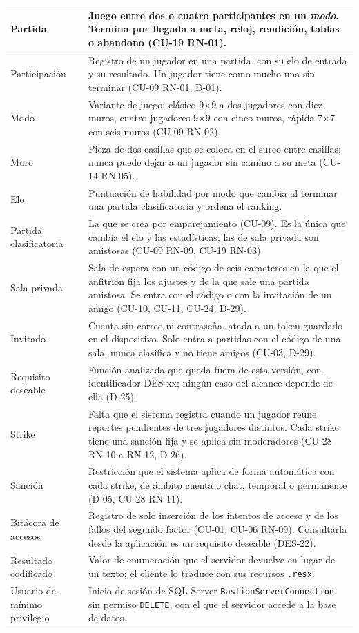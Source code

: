 \documentclass[11pt,letterpaper]{article}
\begin{document}
\begin{xltabular}{\linewidth}{|p{5.2cm}|Y|}
  Partida & Juego entre dos o cuatro participantes en un \textit{modo}. Termina por llegada a meta, reloj, rendición, tablas o abandono (CU-19 RN-01).\\\hline
  Participación & Registro de un jugador en una partida, con su elo de entrada y su resultado. Un jugador tiene como mucho una sin terminar (CU-09 RN-01, D-01).\\\hline
  Modo & Variante de juego: clásico 9×9 a dos jugadores con diez muros, cuatro jugadores 9×9 con cinco muros, rápida 7×7 con seis muros (CU-09 RN-02).\\\hline
  Muro & Pieza de dos casillas que se coloca en el surco entre casillas; nunca puede dejar a un jugador sin camino a su meta (CU-14 RN-05).\\\hline
  Elo & Puntuación de habilidad por modo que cambia al terminar una partida clasificatoria y ordena el ranking.\\\hline
  Partida clasificatoria & La que se crea por emparejamiento (CU-09). Es la única que cambia el elo y las estadísticas; las de sala privada son amistosas (CU-09 RN-09, CU-19 RN-03).\\\hline
  Sala privada & Sala de espera con un código de seis caracteres en la que el anfitrión fija los ajustes y de la que sale una partida amistosa. Se entra con el código o con la invitación de un amigo (CU-10, CU-11, CU-24, D-29).\\\hline
  Invitado & Cuenta sin correo ni contraseña, atada a un token guardado en el dispositivo. Solo entra a partidas con el código de una sala, nunca clasifica y no tiene amigos (CU-03, D-29).\\\hline
  Requisito deseable & Función analizada que queda fuera de esta versión, con identificador DES-xx; ningún caso del alcance depende de ella (D-25).\\\hline
  Strike & Falta que el sistema registra cuando un jugador reúne reportes pendientes de tres jugadores distintos. Cada strike tiene una sanción fija y se aplica sin moderadores (CU-28 RN-10 a RN-12, D-26).\\\hline
  Sanción & Restricción que el sistema aplica de forma automática con cada strike, de ámbito cuenta o chat, temporal o permanente (D-05, CU-28 RN-11).\\\hline
  Bitácora de accesos & Registro de solo inserción de los intentos de acceso y de los fallos del segundo factor (CU-01, CU-06 RN-09). Consultarla desde la aplicación es un requisito deseable (DES-22).\\\hline
  Resultado codificado & Valor de enumeración que el servidor devuelve en lugar de un texto; el cliente lo traduce con sus recursos \texttt{.resx}.\\\hline
  Usuario de mínimo privilegio & Inicio de sesión de SQL Server \texttt{BastionServerConnection}, sin permiso \texttt{DELETE}, con el que el servidor accede a la base de datos.\\\hline
\end{xltabular}
\end{document}
